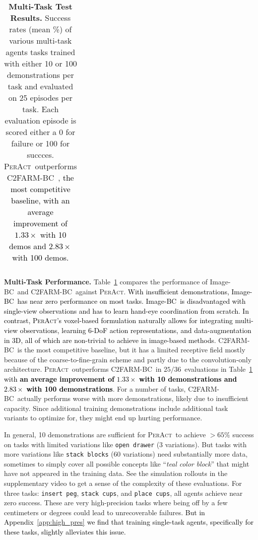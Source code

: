 \documentclass{article}
\newcommand{\appsecref}[1]{Appendix~\ref{#1}}
\newcommand{\tabref}[1]{Table~\ref{#1}}
\newcommand{\bcz}{Image-BC~}
\newcommand{\unet}{C2FARM-BC~}
\newcommand{\highlight}[1]{\textcolor{black}{#1}}
\newcommand{\model}{\textsc{PerAct}}
\begin{document}
\begin{table}[!t]
\begin{tabular}{lcccccccccccccccccc}
\bottomrule
\end{tabular}
\vspace{2pt}
\caption{\textbf{Multi-Task Test Results.} Success rates (mean \%) of various multi-task agents tasks trained with either 10 or 100 demonstrations per task and evaluated on 25 episodes per task. Each evaluation episode is scored either a 0 for failure or 100 for succces. \model~outperforms \unet\citep{c2farm}, \highlight{the most competitive baseline, with an average improvement of $1.33\times$ with 10 demos and $2.83\times$ with 100 demos.}}
\vspace{-0.8cm}
\label{table:rlbench}
\end{table}
 \textbf{Multi-Task Performance.} \tabref{table:rlbench} compares the performance of \bcz and \unet against \model. \highlight{With insufficient demonstrations, \bcz has near zero performance on most tasks. \bcz is disadvantaged with single-view observations and has to learn hand-eye coordination from scratch. In contrast, \model's voxel-based formulation naturally allows for integrating multi-view observations, learning 6-DoF action representations, and data-augmentation in 3D, all of which are non-trivial to achieve in image-based methods}. \unet is the most competitive baseline, but it has a limited receptive field mostly because of the coarse-to-fine-grain scheme and partly due to the convolution-only architecture. \model~outperforms \unet in $25/36$~evaluations in \tabref{table:rlbench} \highlight{with \textbf{an average improvement of} $\mathbf{1.33\times}$ \textbf{with 10 demonstrations and} $\mathbf{2.83\times}$\textbf{ with 100 demonstrations}}. For a number of tasks, \unet actually performs worse with more demonstrations, likely due to insufficient capacity. Since additional training demonstrations include additional task variants to optimize for, they might end up hurting performance. 

\vspace{-0.05cm}
In general, 10 demonstrations are sufficient for \model~to achieve $>65\%$ success on tasks with limited variations like \texttt{open drawer} (3 variations). But tasks with more variations like \texttt{stack blocks} (60 variations) need substantially more data, sometimes to simply cover all possible concepts like ``\textit{teal color block}'' that might have not appeared in the training data. See the simulation rollouts in the supplementary video to get a sense of the complexity of these evaluations. For three tasks: \texttt{insert peg}, \texttt{stack cups}, and \texttt{place cups}, all agents achieve near zero success. These are  very high-precision tasks where being off by a few centimeters or degrees could lead to unrecoverable failures. \highlight{But in \appsecref{app:high_pres} we find that training single-task agents, specifically for these tasks, slightly alleviates this issue.}
\end{document}
